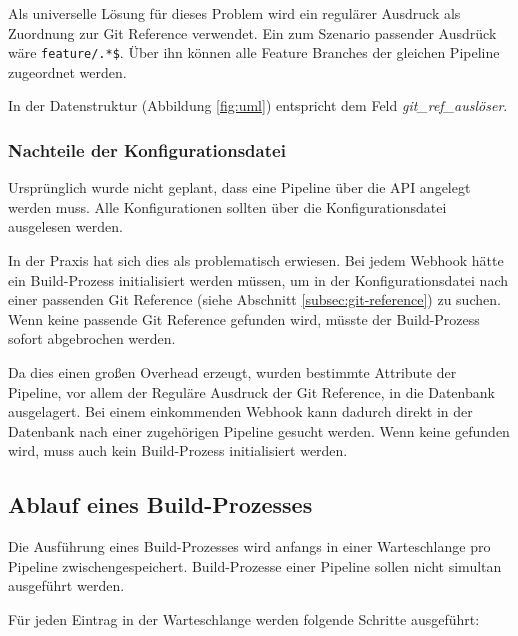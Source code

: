 Als universelle Lösung für dieses Problem wird ein regulärer Ausdruck als Zuordnung zur Git Reference verwendet. Ein zum Szenario passender Ausdrück wäre \texttt{feature/.*\$}. Über ihn können alle Feature Branches der gleichen Pipeline zugeordnet werden.

In der Datenstruktur (Abbildung \ref{fig:uml}) entspricht dem Feld \emph{git\_ref\_auslöser}.

\subsubsection{Nachteile der Konfigurationsdatei}

Ursprünglich wurde nicht geplant, dass eine Pipeline über die API angelegt werden muss. Alle Konfigurationen sollten über die Konfigurationsdatei ausgelesen werden.

In der Praxis hat sich dies als problematisch erwiesen. Bei jedem Webhook hätte ein Build-Prozess initialisiert werden müssen, um in der Konfigurationsdatei nach einer passenden Git Reference (siehe Abschnitt \ref{subsec:git-reference}) zu suchen. Wenn keine passende Git Reference gefunden wird, müsste der Build-Prozess sofort abgebrochen werden.

Da dies einen großen Overhead erzeugt, wurden bestimmte Attribute der Pipeline, vor allem der Reguläre Ausdruck der Git Reference, in die Datenbank ausgelagert. Bei einem einkommenden Webhook kann dadurch direkt in der Datenbank nach einer zugehörigen Pipeline gesucht werden. Wenn keine gefunden wird, muss auch kein Build-Prozess initialisiert werden.

\subsection{Ablauf eines Build-Prozesses}
\label{subsec:ablauf-build}

Die Ausführung eines Build-Prozesses wird anfangs in einer Warteschlange pro Pipeline zwischengespeichert. Build-Prozesse einer Pipeline sollen nicht simultan ausgeführt werden.

Für jeden Eintrag in der Warteschlange werden folgende Schritte ausgeführt:

